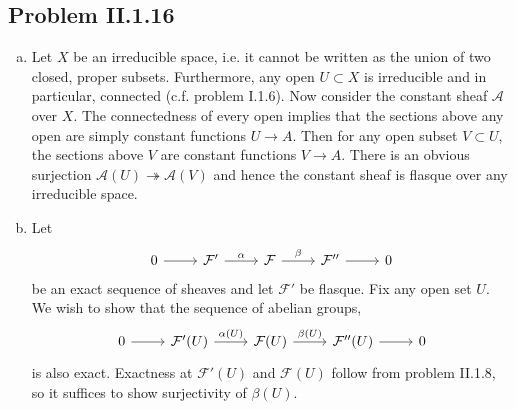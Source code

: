 \documentclass{mathnotes}
\begin{document}
\subsection*{Problem II.1.16}
\begin{enumerate}[(a)]
    \item Let $X$ be an irreducible space, i.e. it cannot be written as the union of two closed, proper subsets.
        Furthermore, any open $U\subset X$ is irreducible and in particular, connected (c.f. problem I.1.6).
        Now consider the constant sheaf $\mathcal{A}$ over $X$. The connectedness of every open implies that the sections
        above any open are simply constant functions $U\to A$. Then for any open subset $V\subset U$,
        the sections above $V$ are constant functions $V\to A$. There is an obvious surjection
        $\mathcal{A}(U)\twoheadrightarrow\mathcal{A}(V)$ and hence the constant sheaf is flasque over any
        irreducible space.
    \item Let
        \begin{equation*}
            \begin{tikzcd}
                0\ar{r} & \mathcal{F}'\ar{r}{\alpha} & \mathcal{F}\ar{r}{\beta} & \mathcal{F}''\ar{r} & 0
            \end{tikzcd}
        \end{equation*}
        be an exact sequence of sheaves and let $\mathcal{F}'$ be flasque. Fix any open set $U$.
        We wish to show that the sequence of abelian groups,
        \begin{equation*}
            \begin{tikzcd}
                0\ar{r} & \mathcal{F}'(U)\ar{r}{\alpha(U)} & \mathcal{F}(U)\ar{r}{\beta(U)} & \mathcal{F}''(U)\ar{r} & 0
            \end{tikzcd}
        \end{equation*}
        is also exact. Exactness at $\mathcal{F}'(U)$ and $\mathcal{F}(U)$ follow from problem II.1.8, so it suffices
        to show surjectivity of $\beta(U)$.
        

\end{enumerate}
\end{document}
